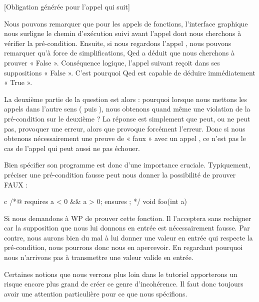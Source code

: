 \documentclass[middle]{zmdocument}
\begin{document}
[Obligation générée pour l'appel qui suit]


Nous pouvons remarquer que pour les appels de fonctions, l'interface graphique
nous surligne le chemin d'exécution suivi avant l'appel dont nous cherchons à 
vérifier la pré-condition. Ensuite, si nous regardons l'appel ,
nous pouvons remarquer qu'à force de simplifications, Qed a déduit que nous 
cherchons à prouver « False ». Conséquence logique, l'appel suivant  
reçoit dans ses suppositions « False ». C'est pourquoi Qed est capable de déduire
immédiatement « True ».



La deuxième partie de la question est alors : pourquoi lorsque nous mettons les 
appels dans l'autre sens ( puis ), nous obtenons 
quand même une violation de la pré-condition sur le deuxième ? La réponse est 
simplement que  peut, ou ne peut pas, provoquer une erreur, alors 
que  provoque forcément l'erreur. Donc si nous obtenons 
nécessairement une preuve de « faux » avec un appel , ce n'est
pas le cas de l'appel  qui peut aussi ne pas échouer.



Bien spécifier son programme est donc d'une importance cruciale. Typiquement, 
préciser une pré-condition fausse peut nous donner la possibilité de prouver 
FAUX :



\begin{CodeBlock}{c}
/*@
  requires a < 0 && a > 0;
  ensures  \false;
*/
void foo(int a){

}
\end{CodeBlock}



Si nous demandons à WP de prouver cette fonction. Il l'acceptera sans rechigner
car la supposition que nous lui donnons en entrée est nécessairement fausse. Par
contre, nous aurons bien du mal à lui donner une valeur en entrée qui respecte la 
pré-condition, nous pourrons donc nous en apercevoir. En regardant pourquoi nous
n'arrivons pas à transmettre une valeur valide en entrée.



Certaines notions que nous verrons plus loin dans le tutoriel apporterons un 
risque encore plus grand de créer ce genre d'incohérence. Il faut donc toujours
avoir une attention particulière pour ce que nous spécifions.
\end{document}
